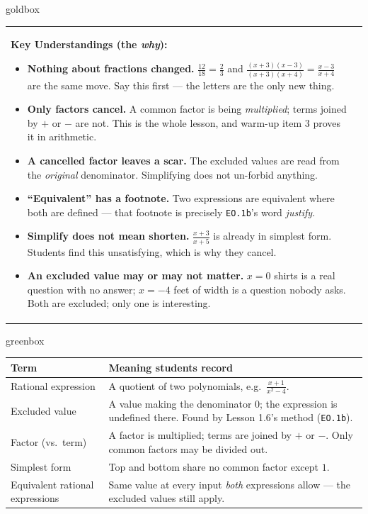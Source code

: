 \documentclass[10pt]{article}
\begin{document}
\begin{skillbox}{goldbox}
\begin{tabularx}{\linewidth}{@{}X|X@{}}
\begin{minipage}[t]{\linewidth}
\textbf{Key Understandings (the \emph{why}):}
\begin{itemize}[leftmargin=1.1em, itemsep=2pt, topsep=2pt]
  \item \textbf{Nothing about fractions changed.} $\tfrac{12}{18}=\tfrac23$ and
        $\tfrac{(x+3)(x-3)}{(x+3)(x+4)}=\tfrac{x-3}{x+4}$ are the same move. Say this first --- the
        letters are the only new thing.
  \item \textbf{Only factors cancel.} A common factor is being \emph{multiplied}; terms joined by
        $+$ or $-$ are not. This is the whole lesson, and warm-up item 3 proves it in arithmetic.
  \item \textbf{A cancelled factor leaves a scar.} The excluded values are read from the
        \emph{original} denominator. Simplifying does not un-forbid anything.
  \item \textbf{``Equivalent'' has a footnote.} Two expressions are equivalent where both are
        defined --- that footnote is precisely \texttt{EO.1b}'s word \emph{justify}.
  \item \textbf{Simplify does not mean shorten.} $\tfrac{x+3}{x+5}$ is already in simplest form.
        Students find this unsatisfying, which is why they cancel.
  \item \textbf{An excluded value may or may not matter.} $x=0$ shirts is a real question with no
        answer; $x=-4$ feet of width is a question nobody asks. Both are excluded; only one is
        interesting.
\end{itemize}
\end{minipage}
\end{tabularx}
\end{skillbox}

\begin{skillbox}{greenbox}
\renewcommand{\arraystretch}{1.35}
\begin{tabularx}{\linewidth}{@{}p{3.6cm}X@{}}
\textbf{Term} & \textbf{Meaning students record} \\
\hline
Rational expression & A quotient of two polynomials, e.g.\ $\frac{x+1}{x^2-4}$. \\
Excluded value & A value making the denominator $0$; the expression is undefined there. Found by
    Lesson 1.6's method (\texttt{EO.1b}). \\
Factor (vs.\ term) & A factor is multiplied; terms are joined by $+$ or $-$. Only common factors
    may be divided out. \\
Simplest form & Top and bottom share no common factor except $1$. \\
Equivalent rational expressions & Same value at every input \emph{both} expressions allow --- the
    excluded values still apply. \\
\end{tabularx}
\end{skillbox}
\end{document}
